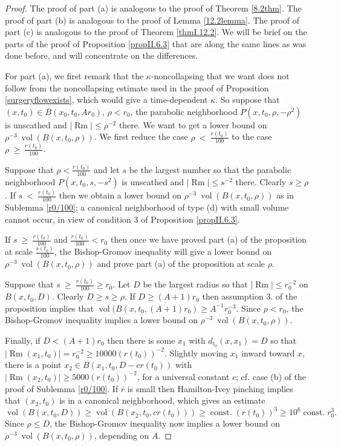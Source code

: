 \documentclass[12pt]{amsart}
\newcommand{\const}{\operatorname{const.}}
\newcommand{\Rm}{\operatorname{Rm}}
\newcommand{\vol}{\operatorname{vol}}
\numberwithin{equation}{section}
\theoremstyle{plain}
\theoremstyle{definition}
\theoremstyle{remark}
\begin{document}
\begin{proof}
The proof of part (a) is analogous to the proof of
Theorem \ref{8.2thm}. The proof of part (b) is analogous to
the proof of Lemma \ref{12.2lemma}. The proof of part (c) is analogous
to the proof of Theorem \ref{thmI.12.2}.
We will be brief on the parts of the proof of Proposition \ref{propII.6.3}
that are along the same lines as was done before, and will
concentrate on the differences.

 
For part (a),
we first remark
 that the $\kappa$-noncollapsing that we want does not follow from
the noncollapsing estimate used in the proof of Proposition
\ref{surgeryflowexists}, which would give a 
time-dependent $\kappa$.
So suppose that $(x,t_0) \in B(x_0, t_0, Ar_0)$, $\rho < r_0$,
the parabolic neighborhood $P(x, t_0, \rho, - \rho^2)$ is
unscathed and $|\Rm| \le \rho^{-2}$ there. We want to get
a lower bound on $\rho^{-3} \: \vol(B(x, t_0, \rho))$.
We first reduce the case $\rho \: < \: \frac{r(t_0)}{100}$ to the
case $\rho \:\geq\: \frac{r(t_0)}{100}$. 

Suppose that $\rho < 
\frac{r(t_0)}{100}$ and let $s$ be the largest
number so that the parabolic neighborhood 
$P(x, t_0, s, - s^2)$ is unscathed and $|\Rm| \le s^{-2}$ there.
Clearly $s \ge \rho$.
If $s \: < \: \frac{r(t_0)}{100}$ then we obtain a lower
bound on $\rho^{-3} \: \vol(B(x, t_0, \rho))$
as in Sublemma \ref{r0/100};
a canonical 
neighborhood of type (d) with small volume cannot occur,
in view of condition 3 of Proposition \ref{propII.6.3}. 

If $s \: \ge \: \frac{r(t_0)}{100}$ and $\frac{r(t_0)}{100} < r_0$
then once we have proved part (a) of the
proposition at scale $\frac{r(t_0)}{100}$, the Bishop-Gromov
inequality will give a lower bound on $\rho^{-3} \: \vol(B(x, t_0, \rho))$
and prove part (a) of the proposition at scale $\rho$.

Suppose that
$s \: \ge \: \frac{r(t_0)}{100} \ge r_0$. Let $D$ be the largest
radius so that $|\Rm| \le r_0^{-2}$ on $B(x,t_0, D)$. 
Clearly $D \ge s \ge \rho$.
If $D \ge
(A+1) r_0$ then assumption 3. of the proposition implies that
$\vol(B(x,t_0,(A+1)r_0) \ge A^{-1} r_0^{-3}$. Since $\rho < r_0$,
the Bishop-Gromov inequality implies a lower bound on 
$\rho^{-3} \: \vol(B(x, t_0, \rho))$. 

Finally, if $D < (A+1)r_0$
then there is some $x_1$ with $d_{t_0}(x,x_1) = D$ so that
$|\Rm(x_1,t_0)| = r_0^{-2} \ge 10000 (r(t_0))^{-2}$. Slightly moving
$x_1$ inward toward $x$, there is a point 
$x_2 \in B(x_1, t_0, D-cr(t_0))$ with
$|\Rm(x_2,t_0)| \ge 5000 (r(t_0))^{-2}$, for a universal constant $c$; 
cf. case (b) of the proof of Sublemma \ref{r0/100}.
If $\overline{r}$ is small then Hamilton-Ivey pinching implies that
$(x_2, t_0)$ is in a canonical neighborhood, which gives an estimate
\begin{equation}
\vol(B(x, t_0, D)) \ge \vol(B(x_2, t_0, cr(t_0))) \ge 
\const (r(t_0))^3 \ge 10^6 \const r_0^3.
\end{equation}
Since $\rho \le D$, the Bishop-Gromov inequality now implies a lower bound on 
$\rho^{-3} \: \vol(B(x, t_0, \rho))$, depending on $A$.


\end{proof}
\end{document}
